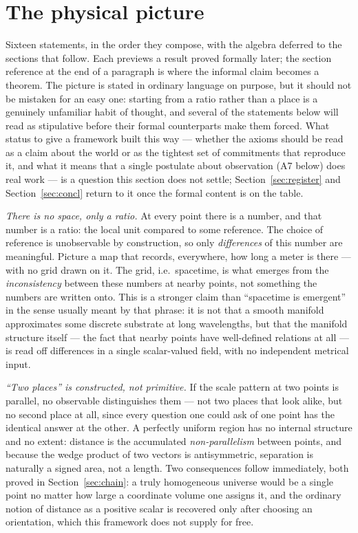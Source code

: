 \documentclass[pdflatex,sn-mathphys-num]{sn-jnl}
\theoremstyle{thmstyleone}
\theoremstyle{thmstylethree}
\theoremstyle{thmstyletwo}
\begin{document}
\section{The physical picture}\label{sec:picture}

Sixteen statements, in the order they compose, with the algebra deferred
to the sections that follow. Each previews a result proved formally
later; the section reference at the end of a paragraph is where the
informal claim becomes a theorem. The picture is stated in ordinary
language on purpose, but it should not be mistaken for an easy one:
starting from a ratio rather than a place is a genuinely unfamiliar
habit of thought, and several of the statements below will read as
stipulative before their formal counterparts make them forced. What
status to give a framework built this way — whether the axioms should be
read as a claim about the world or as the tightest set of commitments
that reproduce it, and what it means that a single postulate about
observation (A7 below) does real work — is a question this section does
not settle; Section~\ref{sec:register} and Section~\ref{sec:concl}
return to it once the formal content is on the table.

\emph{There is no space, only a ratio.} At every point there is a
number, and that number is a ratio: the local unit compared to some
reference. The choice of reference is unobservable by construction, so
only \emph{differences} of this number are meaningful. Picture a map
that records, everywhere, how long a meter is there — with no grid drawn
on it. The grid, i.e.\ spacetime, is what emerges from the
\emph{inconsistency} between these numbers at nearby points, not
something the numbers are written onto. This is a stronger claim than
``spacetime is emergent'' in the sense usually meant by that phrase: it
is not that a smooth manifold approximates some discrete substrate at
long wavelengths, but that the manifold structure itself — the fact that
nearby points have well-defined relations at all — is read off
differences in a single scalar-valued field, with no independent
metrical input.

\emph{``Two places'' is constructed, not primitive.} If the scale
pattern at two points is parallel, no observable distinguishes them —
not two places that look alike, but no second place at all, since every
question one could ask of one point has the identical answer at the
other. A perfectly uniform region has no internal structure and no
extent: distance is the accumulated \emph{non-parallelism} between
points, and because the wedge product of two vectors is antisymmetric,
separation is naturally a signed area, not a length. Two consequences
follow immediately, both proved in Section~\ref{sec:chain}: a truly
homogeneous universe would be a single point no matter how large a
coordinate volume one assigns it, and the ordinary notion of distance as
a positive scalar is recovered only after choosing an orientation, which
this framework does not supply for free.
\end{document}

